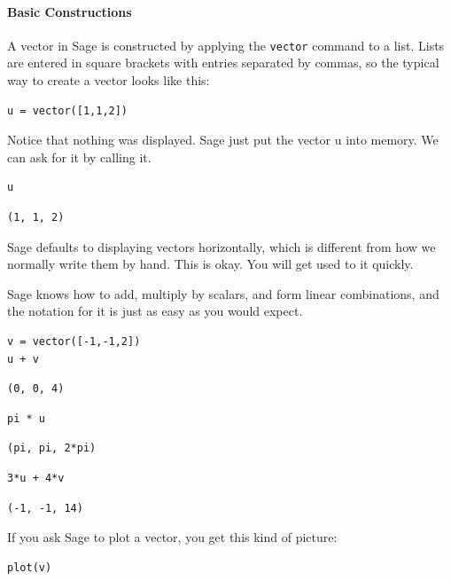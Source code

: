 \documentclass[10pt,]{book}
\theoremstyle{plain}
\numberwithin{equation}{section}
\begin{document}
\paragraph[Basic Constructions]{Basic Constructions}\label{paragraph-4}
A vector in Sage is constructed by applying the \verb?vector? command to a list. Lists are entered in square brackets with entries separated by commas, so the typical way to create a vector looks like this:%
\begin{lstlisting}[style=sageinput]
u = vector([1,1,2])
\end{lstlisting}
\par
Notice that nothing was displayed. Sage just put the vector u into memory. We can ask for it by calling it.%
\begin{lstlisting}[style=sageinput]
u
\end{lstlisting}
\begin{lstlisting}[style=sageoutput]
(1, 1, 2)
\end{lstlisting}
\par
Sage defaults to displaying vectors horizontally, which is different from how we normally write them by hand.
              This is okay. You will get used to it quickly.%
\par
Sage knows how to add, multiply by scalars, and form linear combinations, and the notation for it is just as easy as you would expect.%
\begin{lstlisting}[style=sageinput]
v = vector([-1,-1,2])
u + v
\end{lstlisting}
\begin{lstlisting}[style=sageoutput]
(0, 0, 4)
\end{lstlisting}
\begin{lstlisting}[style=sageinput]
pi * u
\end{lstlisting}
\begin{lstlisting}[style=sageoutput]
(pi, pi, 2*pi)
\end{lstlisting}
\begin{lstlisting}[style=sageinput]
3*u + 4*v
\end{lstlisting}
\begin{lstlisting}[style=sageoutput]
(-1, -1, 14)
\end{lstlisting}
\par
If you ask Sage to plot a vector, you get this kind of picture:%
\begin{lstlisting}[style=sageinput]
plot(v)
\end{lstlisting}
\par
\end{document}
